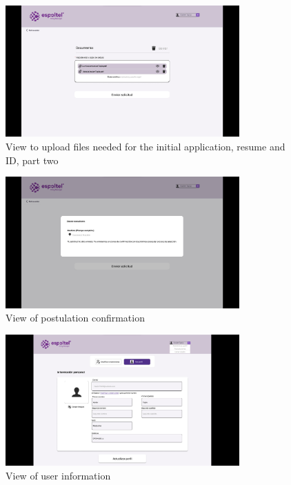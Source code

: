 \documentclass{scrreprt}
\begin{document}
\begin{figure}[H]
	\centering \small
	\includegraphics[width=0.8\textwidth]{WebPrototype/wflow-48.jpeg}
	\caption{View to upload files needed for the initial application, resume and ID, part two}
\end{figure}

\begin{figure}[H]
	\centering \small
	\includegraphics[width=0.8\textwidth]{WebPrototype/wflow-49.jpeg}
	\caption{View of postulation confirmation}
\end{figure}

\begin{figure}[H]
	\centering \small
	\includegraphics[width=0.8\textwidth]{WebPrototype/wflow-50.jpeg}
	\caption{View of user information}
\end{figure}
\end{document}
